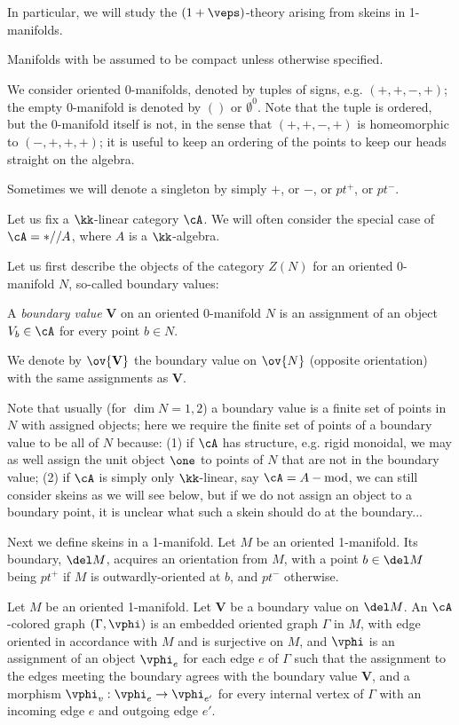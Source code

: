 \documentclass[12pt]{article}
\newcommand{\empt}[1]{{\emptyset^{#1}}}
\newcommand{\VV}{{\mathbf{V}}}
\begin{document}
In particular, we will study the $(1+\veps)$-theory
arising from skeins in 1-manifolds.

Manifolds with be assumed to be compact
unless otherwise specified.

We consider oriented 0-manifolds,
denoted by tuples of signs, e.g. $(+,+,-,+)$;
the empty 0-manifold is denoted by $()$ or $\empt{0}$.
Note that the tuple is ordered, but the 0-manifold itself
is not, in the sense that
$(+,+,-,+)$ is homeomorphic to $(-,+,+,+)$;
it is useful to keep an ordering of the points
to keep our heads straight on the algebra.

Sometimes we will denote a singleton by simply $+$,
or $-$, or $pt^+$, or $pt^-$.

Let us fix a $\kk$-linear category $\cA$.
We will often consider the special case of
$\cA = *//A$, where $A$ is a $\kk$-algebra.

Let us first describe the objects of the category
$Z(N)$ for an oriented 0-manifold $N$,
so-called boundary values:

\begin{definition}
A \emph{boundary value} $\VV$ on an oriented 0-manifold $N$
is an assignment of an object $V_b \in \cA$
for every point $b \in N$.

We denote by $\ov{\VV}$ the boundary value on $\ov{N}$
(opposite orientation) with the same assignments as $\VV$.
\end{definition}

Note that usually (for $\dim N = 1,2$)
a boundary value is a finite set of points in $N$
with assigned objects;
here we require the finite set of points of a boundary value
to be all of $N$ because:
(1) if $\cA$ has structure, e.g. rigid monoidal,
we may as well assign the unit object $\one$ to points
of $N$ that are not in the boundary value;
(2) if $\cA$ is simply only $\kk$-linear,
say $\cA = A-\text{mod}$,
we can still consider skeins as we will see below,
but if we do not assign an object to a boundary point,
it is unclear what such a skein should do at the boundary...


Next we define skeins in a 1-manifold.
Let $M$ be an oriented 1-manifold.
Its boundary, $\del M$, acquires an orientation from $M$,
with a point $b \in \del M$ being $pt^+$ if $M$
is outwardly-oriented at $b$, and $pt^-$ otherwise.

\begin{definition}
\label{d:A-colored-graph}
Let $M$ be an oriented 1-manifold.
Let $\VV$ be a boundary value on $\del M$.
An $\cA$-colored graph $(\Gamma,\vphi)$
is an embedded oriented graph $\Gamma$ in $M$,
with edge oriented in accordance with $M$
and is surjective on $M$,
and $\vphi$ is an assignment of an object $\vphi_e$
for each edge $e$ of $\Gamma$
such that the assignment to the edges meeting the boundary
agrees with the boundary value $\VV$,
and a morphism $\vphi_v: \vphi_e \to \vphi_{e'}$
for every internal vertex of $\Gamma$
with an incoming edge $e$ and outgoing edge $e'$.
\end{definition}
\end{document}
